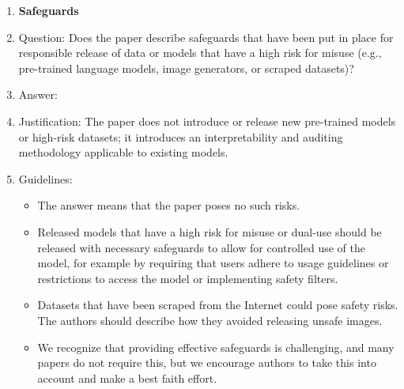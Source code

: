 \documentclass{article}
\begin{document}
\begin{enumerate}
\item {\bf Safeguards}
    \item[] Question: Does the paper describe safeguards that have been put in place for responsible release of data or models that have a high risk for misuse (e.g., pre-trained language models, image generators, or scraped datasets)?
    \item[] Answer: \answerNA{}
    \item[] Justification: The paper does not introduce or release new pre-trained models or high-risk datasets; it introduces an interpretability and auditing methodology applicable to existing models.
    \item[] Guidelines:
    \begin{itemize}
        \item The answer \answerNA{} means that the paper poses no such risks.
        \item Released models that have a high risk for misuse or dual-use should be released with necessary safeguards to allow for controlled use of the model, for example by requiring that users adhere to usage guidelines or restrictions to access the model or implementing safety filters. 
        \item Datasets that have been scraped from the Internet could pose safety risks. The authors should describe how they avoided releasing unsafe images.
        \item We recognize that providing effective safeguards is challenging, and many papers do not require this, but we encourage authors to take this into account and make a best faith effort.
    \end{itemize}


\end{enumerate}
\end{document}
